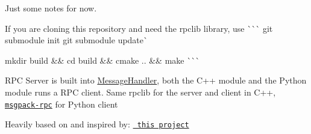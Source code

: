 Just some notes for now.

If you are cloning this repository and need the {\ttfamily rpclib} library, use \`{}\`{}\`{} git submodule init git submodule update\`{} 
\begin{DoxyCode}{0}
\end{DoxyCode}
 mkdir build \&\& cd build \&\& cmake .. \&\& make \`{}\`{}\`{}

R\+PC Server is built into \mbox{\hyperlink{class_message_handler}{Message\+Handler}}, both the C++ module and the Python module runs a R\+PC client. Same {\ttfamily rpclib} for the server and client in C++, \href{https://github.com/msgpack-rpc/msgpack-rpc-python}{\texttt{ {\ttfamily msgpack-\/rpc}}} for Python client

Heavily based on and inspired by\+: \href{https://github.com/djoshea/haptic-control}{\texttt{ this project}} 